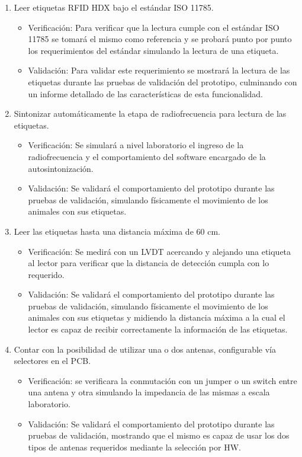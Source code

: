 \documentclass[
11pt, %
]{charter}
\begin{document}
\begin{enumerate}


	
\item  Leer etiquetas RFID HDX bajo el estándar ISO 11785.
          \begin{itemize}
	      \item Verificación: Para verificar que la lectura cumple con el estándar ISO 11785 se tomará el mismo como referencia y se probará punto por punto los requerimientos del estándar simulando la lectura de una etiqueta. 
	      \item Validación: Para validar este requerimiento se mostrará la lectura de las etiquetas durante las pruebas de validación del prototipo, culminando con un informe detallado de las características de esta funcionalidad. 
          \end{itemize}
\item  Sintonizar automáticamente  la etapa de radiofrecuencia para lectura de las etiquetas.
		  \begin{itemize}
	      \item Verificación: Se simulará a nivel laboratorio el ingreso de la radiofrecuencia y el comportamiento del software encargado de la autosintonización.
          \item Validación: Se validará el comportamiento del prototipo durante las pruebas de validación, simulando físicamente el movimiento de los animales con sus etiquetas. 
\end{itemize}
\item  Leer las etiquetas hasta una distancia máxima de 60 cm.
			\begin{itemize}
        	\item Verificación: Se medirá con un LVDT acercando y alejando una etiqueta al lector para verificar que la distancia de detección cumpla con lo requerido. 
	        \item Validación: Se validará el comportamiento del prototipo durante las pruebas de validación, simulando físicamente el movimiento de los animales con sus etiquetas y midiendo la distancia máxima a la cual el lector es capaz de recibir correctamente la información de las etiquetas.
	        \end{itemize} 
\item  Contar con la posibilidad de utilizar una o dos antenas, configurable vía selectores en el PCB.
			 \begin{itemize}
         	\item Verificación: se verificara la conmutación con un jumper o un switch entre una antena y otra simulando la impedancia de las mismas a escala laboratorio.
	        \item Validación: Se validará el comportamiento del prototipo durante las pruebas de validación, mostrando que el mismo es capaz de usar los dos tipos de antenas requeridos mediante la selección por HW.  
            \end{itemize}
			

\end{enumerate}
\end{document}
